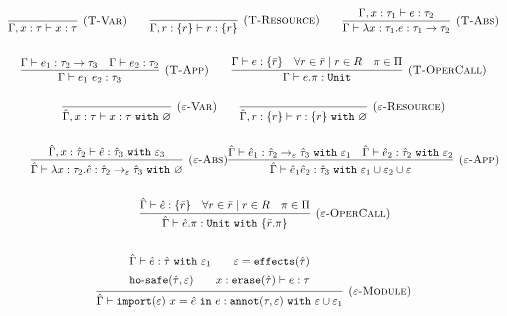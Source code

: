 \documentclass{llncs}
\newcommand{\keywadj}[1]{\mathtt{#1}}
\newcommand{\keyw}[1]{\keywadj{#1}~}
\newcommand{\kw}[1]{\keyw{ #1 }}
\newcommand{\kwa}[1]{\keywadj{ #1 }}
\newcommand{\hyphen}{\hbox{-}}
\begin{document}

\[
\begin{array}{c}


\infer[\textsc{(T-Var)}]
	{\Gamma, x: \tau \vdash x: \tau}
	{}
~~~~~~
\infer[\textsc{(T-Resource)}]
	{\Gamma, r: \{ r \} \vdash r : \{ r \}}
	{}

~~~~~~
\infer[\textsc{(T-Abs)}]
	{\Gamma \vdash \lambda x: \tau_1.e : \tau_1 \rightarrow \tau_2}
	{\Gamma, x: \tau_1 \vdash e: \tau_2}\\[4ex]
	
\infer[\textsc{(T-App)}]
	{\Gamma \vdash e_1~e_2: \tau_3}
	{\Gamma \vdash e_1: \tau_2 \rightarrow \tau_3 & \Gamma \vdash e_2: \tau_2}
~~~~~~
\infer[\textsc{(T-OperCall)}]
	{\Gamma \vdash e.\pi: \kwa{Unit}}
	{\Gamma \vdash e: \{ \bar r \} & \forall r \in \bar r \mid r \in R & \pi \in \Pi}

\end{array}
\]

\noindent
\fbox{$\hat \Gamma \vdash \hat e: \hat \tau~\kw{with} \varepsilon$}

\[
\begin{array}{c}

\infer[\textsc{($\varepsilon$-Var)}]
	{ \hat \Gamma, x:\tau \vdash x: \tau~\kw{with} \varnothing }
	{}
~~~~~~
\infer[\textsc{($\varepsilon$-Resource)}]
 	{ \hat \Gamma, r: \{ r \} \vdash r : \{ r \}~\kw{with} \varnothing }
 	{}\\[4ex]
 	
~~~~~~
	\infer[\textsc{($\varepsilon$-Abs)}]
	{ \hat \Gamma \vdash \lambda x:\tau_2 . \hat e : \hat \tau_2 \rightarrow_{\varepsilon} \hat \tau_3~\kw{with} \varnothing }
	{ \hat \Gamma, x: \hat \tau_2 \vdash \hat e: \hat \tau_3~\kw{with} \varepsilon_3 }
	
	
\infer[\textsc{($\varepsilon$-App)}]
	{ \hat \Gamma \vdash \hat e_1 \hat e_2 : \hat \tau_3~\kw{with} \varepsilon_1 \cup \varepsilon_2 \cup \varepsilon  }
	{ \hat \Gamma \vdash \hat e_1: \hat \tau_2 \rightarrow_{\varepsilon} \hat \tau_3~\kw{with} \varepsilon_1 & \hat \Gamma \vdash \hat e_2: \hat \tau_2~\kw{with} \varepsilon_2 } \\[4ex]
	~~~~~~
	
\infer[\textsc{($\varepsilon$-OperCall)}]
	{ \hat \Gamma \vdash \hat e.\pi: \kw{Unit} \kw{with} \{ \bar r.\pi \} }
	{ \hat \Gamma \vdash \hat e: \{ \bar r \} & \forall r \in \bar r \mid r \in R & \pi \in \Pi }\\[4ex]

\infer[\textsc{($\varepsilon$-Module)}]
	{ \hat \Gamma \vdash \kwa{import}(\varepsilon)~x = \hat e~\kw{in} e: \kwa{annot}(\tau, \varepsilon)~\kw{with} \varepsilon \cup \varepsilon_1 }
{{\def\arraystretch{1.4}
  \begin{array}{c}
\hat \Gamma \vdash \hat e: \hat \tau~\kw{with} \varepsilon_1
~~~~~~
\varepsilon = \kwa{effects}(\hat \tau) \\
\kwa{ho \hyphen safe}(\hat \tau, \varepsilon) ~~~~~~ x: \kwa{erase}(\hat \tau) \vdash e: \tau
  \end{array}}}
 
\end{array}
\]
\end{document}
